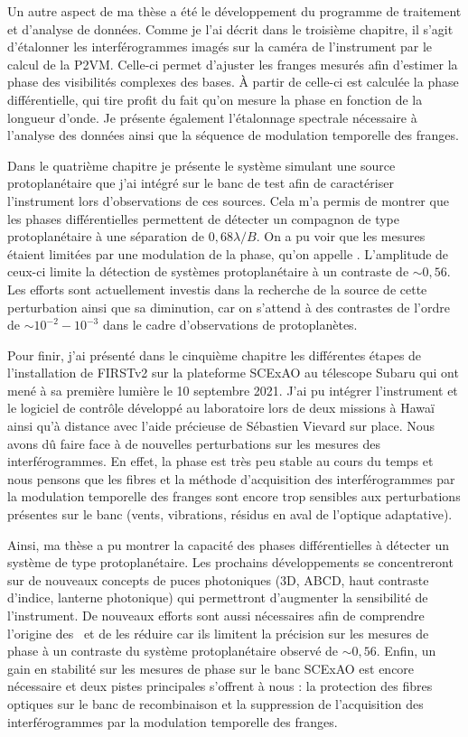 Un autre aspect de ma thèse a été le développement du programme de traitement et d'analyse de données. Comme je l'ai décrit dans le troisième chapitre, il s'agit d'étalonner les interférogrammes imagés sur la caméra de l'instrument par le calcul de la P2VM. Celle-ci permet d'ajuster les franges mesurés afin d'estimer la phase des visibilités complexes des bases. À partir de celle-ci est calculée la phase différentielle, qui tire profit du fait qu'on mesure la phase en fonction de la longueur d'onde. Je présente également l'étalonnage spectrale nécessaire à l'analyse des données ainsi que la séquence de modulation temporelle des franges.

Dans le quatrième chapitre je présente le système simulant une source protoplanétaire que j'ai intégré sur le banc de test afin de caractériser l'instrument lors d'observations de ces sources. Cela m'a permis de montrer que les phases différentielles permettent de détecter un compagnon de type protoplanétaire à une séparation de $0,68 \lambda / B$. On a pu voir que les mesures étaient limitées par une modulation de la phase, qu'on appelle \wiggles. L'amplitude de ceux-ci limite la détection de systèmes protoplanétaire à un contraste de $\sim 0,56$. Les efforts sont actuellement investis dans la recherche de la source de cette perturbation ainsi que sa diminution, car on s'attend à des contrastes de l'ordre de $\sim 10^{-2} - 10^{-3}$ dans le cadre d'observations de protoplanètes.

Pour finir, j'ai présenté dans le cinquième chapitre les différentes étapes de l'installation de FIRSTv2 sur la plateforme SCExAO au télescope Subaru qui ont mené à sa première lumière le 10 septembre 2021. J'ai pu intégrer l'instrument et le logiciel de contrôle développé au laboratoire lors de deux missions à Hawaï ainsi qu'à distance avec l'aide précieuse de Sébastien Vievard sur place. Nous avons dû faire face à de nouvelles perturbations sur les mesures des interférogrammes. En effet, la phase est très peu stable au cours du temps et nous pensons que les fibres et la méthode d'acquisition des interférogrammes par la modulation temporelle des franges sont encore trop sensibles aux perturbations présentes sur le banc (vents, vibrations, résidus en aval de l'optique adaptative).

Ainsi, ma thèse a pu montrer la capacité des phases différentielles à détecter un système de type protoplanétaire. Les prochains développements se concentreront sur de nouveaux concepts de puces photoniques (3D, ABCD, haut contraste d'indice, lanterne photonique) qui permettront d'augmenter la sensibilité de l'instrument. De nouveaux efforts sont aussi nécessaires afin de comprendre l'origine des \wiggles~et de les réduire car ils limitent la précision sur les mesures de phase à un contraste du système protoplanétaire observé de $\sim 0,56$. Enfin, un gain en stabilité sur les mesures de phase sur le banc SCExAO est encore nécessaire et deux pistes principales s'offrent à nous : la protection des fibres optiques sur le banc de recombinaison et la suppression de l'acquisition des interférogrammes par la modulation temporelle des franges.

